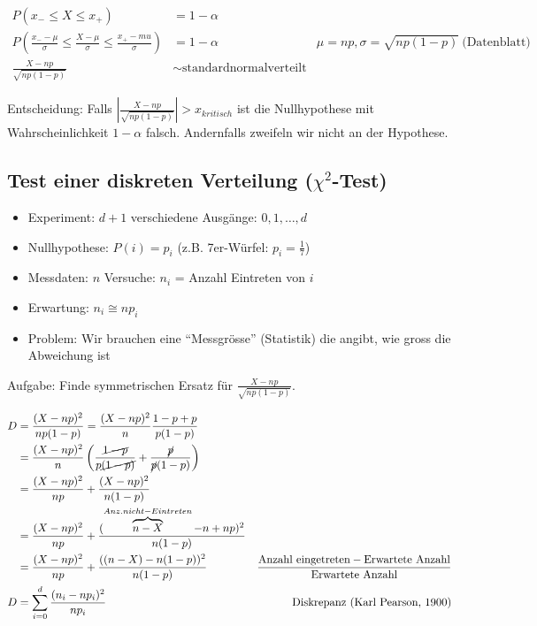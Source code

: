 \documentclass[10pt,a4paper]{scrartcl}
\begin{document}
\begin{align*}
  P(x_- \le X \le x_+) &= 1 - \alpha \\
  P(\frac{x_- - \mu}{\sigma} \le \frac{X-\mu}{\sigma} \le \frac{x_+-mu}{\sigma}) &= 1-\alpha & \mu=np, \sigma=\sqrt{np(1-p)}\  \text{(Datenblatt)} \\
  \frac{X-np}{\sqrt{np(1-p)}} & \sim \text{standardnormalverteilt}
\end{align*}

Entscheidung: Falls $\left|\frac{X-np}{\sqrt{np(1-p)}}\right| > x_{kritisch}$ ist die Nullhypothese mit Wahrscheinlichkeit $1-\alpha$ falsch.
Andernfalls zweifeln wir nicht an der Hypothese.

\subsection{Test einer diskreten Verteilung ($\chi^2$-Test)}
\begin{itemize}
\item Experiment: $d+1$ verschiedene Ausgänge: $0, 1, \dots, d$
\item Nullhypothese: $P(i) = p_i$ (z.B. 7er-Würfel: $p_i=\frac{1}{7}$) 
\item Messdaten: $n$ Versuche: $n_i$ = Anzahl Eintreten von $i$
\item Erwartung: $n_i \cong np_i$
\item Problem: Wir brauchen eine ``Messgrösse'' (Statistik) die angibt, wie gross die Abweichung ist
\end{itemize}
Aufgabe: Finde symmetrischen Ersatz für $\frac{X-np}{\sqrt{np(1-p)}}$.

\begin{align*}
  D &= \frac{(X-np)^2}{np(1-p)} = \frac{(X-np)^2}{n} \frac{1 - p + p}{p(1-p)} \\
    &= \frac{(X-np)^2}{n} \left(\frac{\cancel{1 - p}}{p\cancel{(1-p)}} + \frac{\cancel{p}}{\cancel{p}(1-p)}\right) \\
    &= \frac{(X-np)^2}{np} + \frac{(X-np)^2}{n(1-p)} \\
    &= \frac{(X-np)^2}{np} + \frac{(\overbrace{n-X}^{Anz. nicht-Eintreten}-n+np)^2}{n(1-p)} \\
    &= \frac{(X-np)^2}{np} + \frac{((n-X) -n(1-p))^2}{n(1-p)} & \frac{\text{Anzahl eingetreten} - \text{Erwartete Anzahl}}{\text{Erwartete Anzahl}} \\
  D &= \sum_{i=0}^d \frac{(n_i-np_i)^2}{np_i} &\text{Diskrepanz (Karl Pearson, 1900)}
\end{align*}
\end{document}
